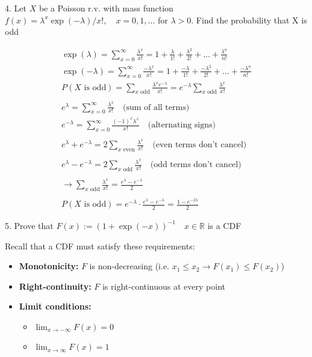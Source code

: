 \documentclass[10pt]{article}
\begin{document}
\newpage

4. Let $X$ be a Poisson r.v. with mass function $f(x) = \lambda^x\exp(-\lambda) / x!, \quad x = 0, 1, …$ for $\lambda > 0$. Find the probability that X is odd

\begin{gather*}
    \exp (\lambda) = \sum_{x = 0}^{\infty} \frac{\lambda^x}{x!} = 1 + \frac{\lambda}{1!} + \frac{\lambda^2}{2!} + … + \frac{\lambda^n}{n!}\\
    \exp (-\lambda) = \sum_{x = 0}^{\infty} \frac{-\lambda^x}{x!} = 1 + \frac{-\lambda}{1!} + \frac{-\lambda^2}{2!} + … + \frac{-\lambda^n}{n!}\\
    P(X \text{ is odd}) = \sum_{x \text{ odd}} \frac{\lambda^x e^{-\lambda}}{x!} = e^{-\lambda} \sum_{x \text{ odd}} \frac{\lambda^x}{x!}\\
    \\
    e^{\lambda} = \sum_{x=0}^{\infty} \frac{\lambda^x}{x!}\quad\text{(sum of all terms)}\\
    e^{-\lambda} = \sum_{x=0}^{\infty} \frac{(-1)^x\lambda^x}{x!}\quad\text{(alternating signs)}\\
    \\
    e^{\lambda} + e^{-\lambda} = 2\sum_{x \text{ even}} \frac{\lambda^x}{x!} \quad\text{(even terms don't cancel)}\\
    \\
    e^{\lambda} - e^{-\lambda} = 2\sum_{x \text{ odd}} \frac{\lambda^x}{x!}\quad\text{(odd terms don't cancel)}\\
    \\
    \to \sum_{x \text{ odd}} \frac{\lambda^x}{x!} = \frac{e^{\lambda} - e^{-\lambda}}{2}\\
    \\
    P(X \text{ is odd}) = e^{-\lambda} \cdot \frac{e^{\lambda} - e^{-\lambda}}{2} = \frac{1 - e^{-2\lambda}}{2}
\end{gather*}

\newpage

5. Prove that $F(x) := (1 + \exp (-x))^{-1}\quad x \in \mathbb{R}$ is a CDF

Recall that a CDF must satisfy these requirements:

\begin{itemize}
    \item \textbf{Monotonicity:} $F$ is non-decreasing (i.e. $x_1 \leq x_2 \to F(x_1) \leq F(x_2)$)
    \item \textbf{Right-continuity:} $F$ is right-continuous at every point
    \item \textbf{Limit conditions:} 
    \begin{itemize}
        \item $\lim_{x \to -\infty} F(x) = 0$
        \item $\lim_{x \to \infty} F(x) = 1$
    \end{itemize}
\end{itemize}
\end{document}
